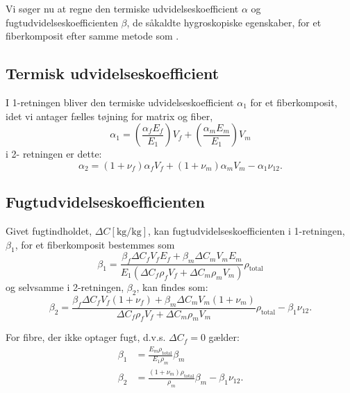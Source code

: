 
Vi søger nu at regne den termiske udvidelseskoefficient $\alpha$ og fugtudvidelseskoefficienten $\beta$, de såkaldte hygroskopiske egenskaber, for et fiberkomposit efter samme metode som .

\subsection{Termisk udvidelseskoefficient}
I 1-retningen bliver den termiske udvidelseskoefficient $\alpha_1$ for et fiberkomposit, idet vi antager fælles tøjning for matrix og fiber,
\begin{equation*}
  \alpha_1 = \left( \frac{\alpha_f E_f}{E_1} \right) V_f + \left( \frac{\alpha_m E_m}{E_1} \right) V_m
\end{equation*}
i 2- retningen er dette:
\begin{equation*}
  \alpha_2 = \left( 1 +\nu_f \right)\alpha_f V_f + \left( 1 + \nu_m \right) \alpha_m V_m - \alpha_1 \nu_{12}
.\end{equation*}

\subsection{Fugtudvidelseskoefficienten}
Givet fugtindholdet, $\Delta C \left[ \unit{\kg\per\kg} \right]$, kan fugtudvidelseskoefficienten i 1-retningen, $\beta_1$, for et fiberkomposit bestemmes som
\begin{equation*}
  \beta_1 = \frac{\beta_f \Delta C_f V_f E_f + \beta_m \Delta C_m V_m E_m}{E_1 \left( \Delta C_f \rho_f V_f + \Delta C_m \rho_m V_m \right)} \rho_{\text{total}}
\end{equation*}
og selvsamme i 2-retningen, $\beta_2$, kan findes som:
\begin{equation*}
  \beta_2 = \frac{\beta_f \Delta C_f V_f (1 + \nu_f ) + \beta_m \Delta C_m V_m (1 + \nu_m)}{\Delta C_f \rho_f V_f + \Delta C_m \rho_m V_m} \rho_{\text{total}} - \beta_1 \nu_{12}
.\end{equation*}

For fibre, der ikke optager fugt, d.v.s. $\Delta C_f = 0$ gælder:
\begin{align*}
  \beta_1 &= \frac{E_m \rho_{\text{total}}}{E_1 \rho_m} \beta_m \\
  \beta_2 &= \frac{(1+\nu_m) \rho_{\text{total}}}{\rho_m}\beta_m - \beta_1 \nu_{12}
.\end{align*}

